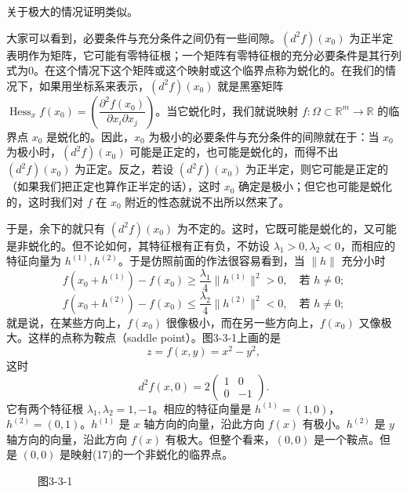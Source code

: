 关于极大的情况证明类似。

大家可以看到，必要条件与充分条件之间仍有一些间隙。$(d^2f)(x_0)$ 为正半定表明作为矩阵，它可能有零特征根；一个矩阵有零特征根的充分必要条件是其行列式为0。在这个情况下这个矩阵或这个映射或这个临界点称为蜕化的。在我们的情况下，如果用坐标系来表示，$(d^2f)(x_0)$ 就是黑塞矩阵 $\operatorname{Hess}_x f(x_0)=\left(\dfrac{\partial^2f(x_0)}{\partial x_i\partial x_j}\right)$。当它蜕化时，我们就说映射 $f:\Omega\subset\mathbb R^m\to\mathbb R$ 的临界点 $x_0$ 是蜕化的。因此，$x_0$ 为极小的必要条件与充分条件的间隙就在于：当 $x_0$ 为极小时，$(d^2f)(x_0)$ 可能是正定的，也可能是蜕化的，而得不出 $(d^2f)(x_0)$ 为正定。反之，若设 $(d^2f)(x_0)$ 为正半定，则它可能是正定的（如果我们把正定也算作正半定的话），这时 $x_0$ 确定是极小；但它也可能是蜕化的，这时我们对 $f$ 在 $x_0$ 附近的性态就说不出所以然来了。

于是，余下的就只有 $(d^2f)(x_0)$ 为不定的。这时，它既可能是蜕化的，又可能是非蜕化的。但不论如何，其特征根有正有负，不妨设 $\lambda_1>0,\lambda_2<0$，而相应的特征向量为 $h^{(1)},h^{(2)}$。于是仿照前面的作法很容易看到，当 $\lVert h\rVert$ 充分小时
\[
 f(x_0+h^{(1)})-f(x_0)\ge\frac{\lambda_1}{4}\lVert h^{(1)}\rVert^2>0,\quad \text{若 }h\ne0;
\]
\[
 f(x_0+h^{(2)})-f(x_0)\le\frac{\lambda_2}{4}\lVert h^{(2)}\rVert^2<0,\quad \text{若 }h\ne0;
\]
就是说，在某些方向上，$f(x_0)$ 很像极小，而在另一些方向上，$f(x_0)$ 又像极大。这样的点称为鞍点（saddle point）。图3-3-1上画的是
\[
 z=f(x,y)=x^2-y^2,
\]
这时
\[
 d^2f(x,0)=2\begin{pmatrix}1&0\\0&-1\end{pmatrix}.
\]
它有两个特征根 $\lambda_1,\lambda_2=1,-1$。相应的特征向量是 $h^{(1)}=(1,0)$，$h^{(2)}=(0,1)$。$h^{(1)}$ 是 $x$ 轴方向的向量，沿此方向 $f(x)$ 有极小。$h^{(2)}$ 是 $y$ 轴方向的向量，沿此方向 $f(x)$ 有极大。但整个看来，$(0,0)$ 是一个鞍点。但是 $(0,0)$ 是映射(17)的一个非蜕化的临界点。

\begin{figure}[htbp]
\centering
{}
\caption*{图3-3-1}
\end{figure}

